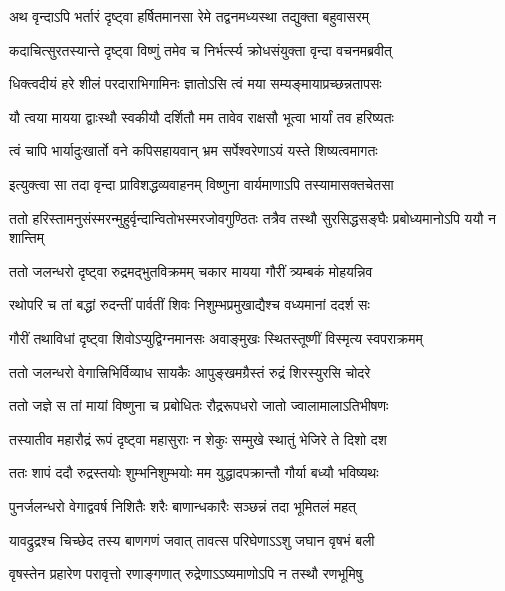 \twolineshloka
{अथ वृन्दाऽपि भर्तारं दृष्ट्वा हर्षितमानसा}
{रेमे तद्वनमध्यस्था तद्युक्ता बहुवासरम्} %

\twolineshloka
{कदाचित्सुरतस्यान्ते दृष्ट्वा विष्णुं तमेव च}
{निर्भर्त्स्य क्रोधसंयुक्ता वृन्दा वचनमब्रवीत्} %


\twolineshloka
{धिक्त्वदीयं हरे शीलं परदाराभिगामिनः}
{ज्ञातोऽसि त्वं मया सम्यङ्मायाप्रच्छन्नतापसः} %

\twolineshloka
{यौ त्वया मायया द्वाःस्थौ स्वकीयौ दर्शितौ मम}
{तावेव राक्षसौ भूत्वा भार्यां तव हरिष्यतः} %

\twolineshloka
{त्वं चापि भार्यादुःखार्तो वने कपिसहायवान्}
{भ्रम सर्पेश्वरेणाऽयं यस्ते शिष्यत्वमागतः} %

\twolineshloka
{इत्युक्त्वा सा तदा वृन्दा प्राविशद्धव्यवाहनम्}
{विष्णुना वार्यमाणाऽपि तस्यामासक्तचेतसा} %

\twolineshloka
{ततो हरिस्तामनुसंस्मरन्मुहुर्वृन्दान्वितोभस्मरजोवगुण्ठितः}
{तत्रैव तस्थौ सुरसिद्धसङ्घैः प्रबोध्यमानोऽपि ययौ न शान्तिम्} %





\twolineshloka
{ततो जलन्धरो दृष्ट्वा रुद्रमद्भुतविक्रमम्}
{चकार मायया गौरीं त्र्यम्बकं मोहयन्निव} %

\twolineshloka
{रथोपरि च तां बद्धां रुदन्तीं पार्वतीं शिवः}
{निशुम्भप्रमुखाद्यैश्च वध्यमानां ददर्श सः} %

\twolineshloka
{गौरीं तथाविधां दृष्ट्वा शिवोऽप्युद्विग्नमानसः}
{अवाङ्मुखः स्थितस्तूष्णीं विस्मृत्य स्वपराक्रमम्} %

\twolineshloka
{ततो जलन्धरो वेगात्त्रिभिर्विव्याध सायकैः}
{आपुङ्खमग्रैस्तं रुद्रं शिरस्युरसि चोदरे} %

\twolineshloka
{ततो जज्ञे स तां मायां विष्णुना च प्रबोधितः}
{रौद्ररूपधरो जातो ज्वालामालाऽतिभीषणः} %

\twolineshloka
{तस्यातीव महारौद्रं रूपं दृष्ट्वा महासुराः}
{न शेकुः सम्मुखे स्थातुं भेजिरे ते दिशो दश} %

\twolineshloka
{ततः शापं ददौ रुद्रस्तयोः शुम्भनिशुम्भयोः}
{मम युद्धादपक्रान्तौ गौर्या बध्यौ भविष्यथः} %

\twolineshloka
{पुनर्जलन्धरो वेगाद्ववर्ष निशितैः शरैः}
{बाणान्धकारैः सञ्छन्नं तदा भूमितलं महत्} %

\twolineshloka
{यावद्रुद्रश्च चिच्छेद तस्य बाणगणं जवात्}
{तावत्स परिघेणाऽऽशु जघान वृषभं बली} %

\twolineshloka
{वृषस्तेन प्रहारेण परावृत्तो रणाङ्गणात्}
{रुद्रेणाऽऽष्यमाणोऽपि न तस्थौ रणभूमिषु} %

